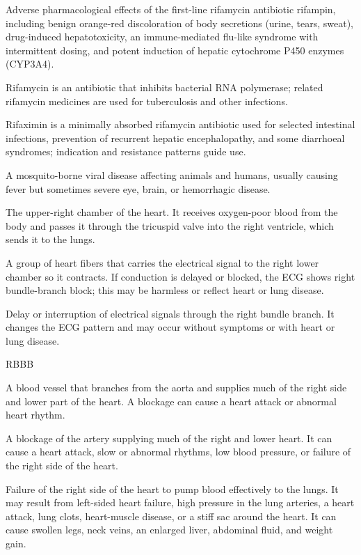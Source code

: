  Adverse pharmacological effects of the first-line rifamycin antibiotic rifampin, including benign orange-red discoloration of body secretions (urine, tears, sweat), drug-induced hepatotoxicity, an immune-mediated flu-like syndrome with intermittent dosing, and potent induction of hepatic cytochrome P450 enzymes (CYP3A4).

 Rifamycin is an antibiotic that inhibits bacterial RNA polymerase; related rifamycin medicines are used for tuberculosis and other infections.

 Rifaximin is a minimally absorbed rifamycin antibiotic used for selected intestinal infections, prevention of recurrent hepatic encephalopathy, and some diarrhoeal syndromes; indication and resistance patterns guide use.

 A mosquito-borne viral disease affecting animals and humans, usually causing fever but sometimes severe eye, brain, or hemorrhagic disease.

 The upper-right chamber of the heart. It receives oxygen-poor blood from the body and passes it through the tricuspid valve into the right ventricle, which sends it to the lungs.

 A group of heart fibers that carries the electrical signal to the right lower chamber so it contracts. If conduction is delayed or blocked, the ECG shows right bundle-branch block; this may be harmless or reflect heart or lung disease.

 Delay or interruption of electrical signals through the right bundle branch. It changes the ECG pattern and may occur without symptoms or with heart or lung disease.

\synonyms
RBBB

 A blood vessel that branches from the aorta and supplies much of the right side and lower part of the heart. A blockage can cause a heart attack or abnormal heart rhythm.

 A blockage of the artery supplying much of the right and lower heart. It can cause a heart attack, slow or abnormal rhythms, low blood pressure, or failure of the right side of the heart.

 Failure of the right side of the heart to pump blood effectively to the lungs. It may result from left-sided heart failure, high pressure in the lung arteries, a heart attack, lung clots, heart-muscle disease, or a stiff sac around the heart. It can cause swollen legs, neck veins, an enlarged liver, abdominal fluid, and weight gain.

